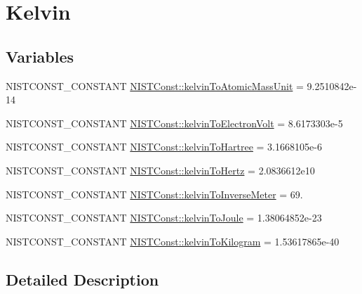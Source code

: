 \hypertarget{group___n_i_s_t_const-_kelvin}{}\section{Kelvin}
\label{group___n_i_s_t_const-_kelvin}
\subsection*{Variables}
\begin{DoxyCompactItemize}
\item 
N\+I\+S\+T\+C\+O\+N\+S\+T\+\_\+\+C\+O\+N\+S\+T\+A\+NT \mbox{\hyperlink{group___n_i_s_t_const-_kelvin_ga06d7f847cbeeb75fd01a52b95b60de50}{N\+I\+S\+T\+Const\+::kelvin\+To\+Atomic\+Mass\+Unit}} = 9.\+2510842e-\/14
\item 
N\+I\+S\+T\+C\+O\+N\+S\+T\+\_\+\+C\+O\+N\+S\+T\+A\+NT \mbox{\hyperlink{group___n_i_s_t_const-_kelvin_ga85355343e763185fe602b8eeacebc12d}{N\+I\+S\+T\+Const\+::kelvin\+To\+Electron\+Volt}} = 8.\+6173303e-\/5
\item 
N\+I\+S\+T\+C\+O\+N\+S\+T\+\_\+\+C\+O\+N\+S\+T\+A\+NT \mbox{\hyperlink{group___n_i_s_t_const-_kelvin_gaddf6d309db30c552489d13894901746a}{N\+I\+S\+T\+Const\+::kelvin\+To\+Hartree}} = 3.\+1668105e-\/6
\item 
N\+I\+S\+T\+C\+O\+N\+S\+T\+\_\+\+C\+O\+N\+S\+T\+A\+NT \mbox{\hyperlink{group___n_i_s_t_const-_kelvin_ga3fc1294bab1527265c87fd2df49d568c}{N\+I\+S\+T\+Const\+::kelvin\+To\+Hertz}} = 2.\+0836612e10
\item 
N\+I\+S\+T\+C\+O\+N\+S\+T\+\_\+\+C\+O\+N\+S\+T\+A\+NT \mbox{\hyperlink{group___n_i_s_t_const-_kelvin_ga7c76d99ebcba19f9c15c6dc96282576b}{N\+I\+S\+T\+Const\+::kelvin\+To\+Inverse\+Meter}} = 69.
\item 
N\+I\+S\+T\+C\+O\+N\+S\+T\+\_\+\+C\+O\+N\+S\+T\+A\+NT \mbox{\hyperlink{group___n_i_s_t_const-_kelvin_ga2257299cf7bd7dd841a7325e47a67907}{N\+I\+S\+T\+Const\+::kelvin\+To\+Joule}} = 1.\+38064852e-\/23
\item 
N\+I\+S\+T\+C\+O\+N\+S\+T\+\_\+\+C\+O\+N\+S\+T\+A\+NT \mbox{\hyperlink{group___n_i_s_t_const-_kelvin_gad28887701d9265b5489c4deaabee8deb}{N\+I\+S\+T\+Const\+::kelvin\+To\+Kilogram}} = 1.\+53617865e-\/40
\end{DoxyCompactItemize}


\subsection{Detailed Description}


